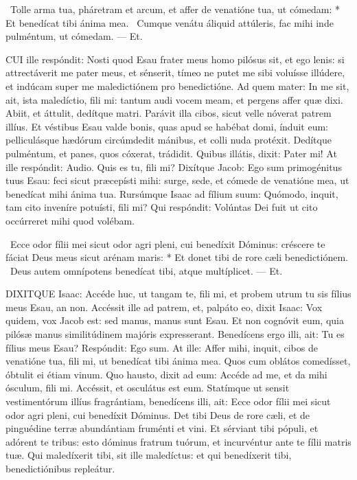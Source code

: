 \R\ Tolle arma tua, pháretram et arcum, et affer de venatióne tua, ut cómedam: * Et benedícat tibi ánima mea. \V\ Cumque venátu áliquid attúleris, fac mihi inde pulméntum, ut cómedam. --- Et.


\lettrine[lines=2]{C}{UI} ille respóndit: Nosti quod Esau frater meus homo pilósus sit, et ego lenis: si attrectáverit me pater meus, et sénserit, tímeo ne putet me sibi voluísse illúdere, et indúcam super me maledictiónem pro benedictióne. Ad quem mater: In me sit, ait, ista maledíctio, fili mi: tantum audi vocem meam, et pergens affer quæ dixi. Abiit, et áttulit, dedítque matri. Parávit illa cibos, sicut velle nóverat patrem illíus. Et véstibus Esau valde bonis, quas apud se habébat domi, índuit eum: pelliculásque hædórum circúmdedit mánibus, et colli nuda protéxit. Dedítque pulméntum, et panes, quos cóxerat, trádidit. Quibus illátis, dixit: Pater mi! At ille respóndit: Audio. Quis es tu, fili mi? Dixítque Jacob: Ego sum primogénitus tuus Esau: feci sicut præcepísti mihi: surge, sede, et cómede de venatióne mea, ut benedícat mihi ánima tua. Rursúmque Isaac ad fílium suum: Quómodo, inquit, tam cito inveníre potuísti, fili mi? Qui respóndit: Volúntas Dei fuit ut cito occúrreret mihi quod volébam.

\R\ Ecce odor fílii mei sicut odor agri pleni, cui benedíxit Dóminus: créscere te fáciat Deus meus sicut arénam maris: * Et donet tibi de rore cæli benedictiónem. \V\ Deus autem omnípotens benedícat tibi, atque multíplicet. --- Et.


\lettrine[lines=2]{D}{IXITQUE} Isaac: Accéde huc, ut tangam te, fili mi, et probem utrum tu sis fílius meus Esau, an non. Accéssit ille ad patrem, et, palpáto eo, dixit Isaac: Vox quidem, vox Jacob est: sed manus, manus sunt Esau. Et non cognóvit eum, quia pilósæ manus similitúdinem majóris expresserant. Benedícens ergo illi, ait: Tu es fílius meus Esau? Respóndit: Ego sum. At ille: Affer mihi, inquit, cibos de venatióne tua, fili mi, ut benedícat tibi ánima mea. Quos cum oblátos comedísset, óbtulit ei étiam vinum. Quo hausto, dixit ad eum: Accéde ad me, et da mihi ósculum, fili mi. Accéssit, et osculátus est eum. Statímque ut sensit vestimentórum illíus fragrántiam, benedícens illi, ait: Ecce odor fílii mei sicut odor agri pleni, cui benedíxit Dóminus. Det tibi Deus de rore cæli, et de pinguédine terræ abundántiam fruménti et vini. Et sérviant tibi pópuli, et adórent te tribus: esto dóminus fratrum tuórum, et incurvéntur ante te fílii matris tuæ. Qui maledíxerit tibi, sit ille maledíctus: et qui benedíxerit tibi, benedictiónibus repleátur.

